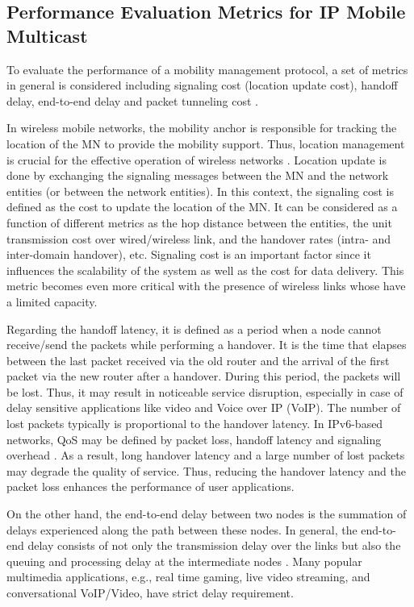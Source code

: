 \subsection{ Performance Evaluation Metrics for IP Mobile Multicast}
To evaluate the performance of a mobility management protocol, a set of metrics in general is considered including signaling cost (location update cost), handoff delay, end-to-end delay and packet tunneling cost \cite{HO_comparison_Makaya, HO_comparison_Lee,HO_comparison_Costa,RO_PMIPv6_Lee}.

In wireless mobile networks, the mobility anchor is responsible for tracking the location of the MN to provide the mobility support. 
Thus, location management is crucial for the effective operation of wireless networks \cite{movement_based_mobility}. Location update is done by exchanging the signaling messages between the MN and the network entities (or between the network entities). In this context, the signaling cost is defined as the cost to update the location of the MN. It can be considered as a function of different metrics as the hop distance between the entities, the unit transmission cost over wired/wireless link, and the handover rates (intra- and inter-domain handover), etc. Signaling cost is an important factor since it influences the scalability of the system as well as the cost for data delivery. This metric becomes even more critical with the presence of wireless links whose have a limited capacity.

Regarding the handoff latency, it is defined as a period when a node cannot receive/send the packets while performing a handover. It is the time that elapses between the last packet received via the old router and the arrival of the first packet via the new router after a handover. During this period, the packets will be lost. Thus, it may result in noticeable service disruption, especially in case of delay sensitive applications like video and Voice over IP (VoIP). The number of lost packets typically is proportional to the handover latency. In IPv6-based networks, QoS may be defined by packet loss, handoff latency and signaling overhead \cite{HO_comparison_Makaya}. As a result, long handover latency and a large number of lost packets may degrade the quality of service. Thus, reducing the handover latency and the packet loss enhances the performance of user applications. 

On the other hand, the end-to-end delay between two nodes is the summation of delays experienced along the path between these nodes. In general, the end-to-end delay consists of not only the transmission delay over the links but also the queuing and processing delay at the intermediate nodes \cite{e2e_delay_Li}. Many popular multimedia applications, e.g., real time gaming, live video streaming, and conversational VoIP/Video, have strict delay requirement. 

